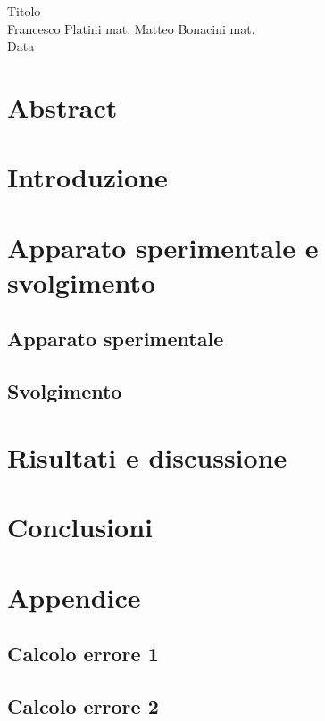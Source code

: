 \documentclass[12pt, a4paper, twoside]{article}
\begin{document}
\begin{center}
  \huge Titolo \\
  \large Francesco Platini mat. Matteo Bonacini mat.\\
  Data
\end{center}


\section{Abstract}\label{sec:abstract}
  \blindtext[1]

\section{Introduzione}\label{sec:introduzione}
  \blindtext[2]

\section{Apparato sperimentale e svolgimento}\label{sec:apparato-sperimentale-e-svolgimento}
  \subsection{Apparato sperimentale}\label{subsec:apparato-sperimentale}
    \blindtext[1]
  \subsection{Svolgimento}\label{subsec:svolgimento}
    \blindtext[1]

\section{Risultati e discussione}\label{sec:risultati-e-discussione}
  \blindtext[2]

\section{Conclusioni}\label{sec:conclusioni}
  \blindtext[1]

\newpage
\section{Appendice}
  \subsection{Calcolo errore 1}
    \blindtext[1]
  \subsection{Calcolo errore 2}
    \blindtext[1]
\end{document}
